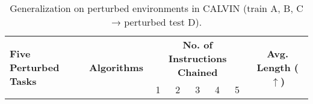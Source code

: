 \begin{table}[ht]\small
    \centering
    \vspace{-1.5em}
    \caption{Generalization on perturbed environments in CALVIN (train A, B, C → perturbed test D).
    }
    \vspace{0.5em}
    \renewcommand{\arraystretch}{0.8}
    \begin{tabular}{l c ccccc c}
        \toprule
        \multirow{2}{*}{\textbf{Five Perturbed Tasks}} & \multirow{2}{*}{\textbf{Algorithms}} & \multicolumn{5}{c}{\textbf{No. of Instructions Chained}} & \multirow{2}{*}{\textbf{Avg. Length ($\uparrow$)}} \\
        \cmidrule(lr){3-7}
        & & 1 & 2 & 3 & 4 & 5 & \\
        \midrule


\end{tabular}
\end{table}
